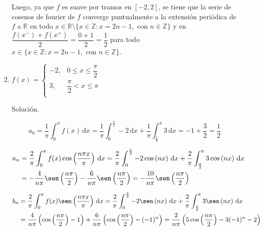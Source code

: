 \documentclass[fleqn]{article}
\newcommand{\real}{\mathbb{R}}
\newcommand{\ent}{\mathbb{Z}}
\newcommand{\intg}[3]{\int_{#1}^{#2} #3 \, \mathrm{d}x}
\begin{document}
\begin{enumerate}[I.]
\begin{enumerate}[(1)]
			Luego, ya que $f$ es suave por tramos en $ [-2,2] $, se tiene que la serie de cosenos de fourier de $f$ converge puntualmente a la extensión periódica de $f$ a $ \real $ en todo $ x \in \real \setminus \{ x \in \ent \colon x = 2n-1, \mbox{ con } n \in \ent \} $ y en $ \dfrac{f(x^-) + f(x^+)}{2} = \dfrac{0+1}{2} = \dfrac{1}{2} $ para todo $ x \in \{ x \in \ent \colon x = 2n-1, \mbox{ con } n \in \ent \} $.


			\bfseries
			\item $ f(x) = \begin{cases}
				-2, & 0 \leq x \leq \dfrac{\pi}{2} \\
				3, & \dfrac{\pi}{2} < x \leq \pi \\
			\end{cases} $

			Solución.

			\normalfont

			\begin{equation*}
				a_0 = \dfrac{1}{\pi} \intg{0}{\pi}{f(x)} = \dfrac{1}{\pi} \intg{0}{\frac{\pi}{2}}{-2} + \dfrac{1}{\pi} \intg{\frac{\pi}{2}}{\pi}{3} = -1 + \dfrac{3}{2} = \dfrac{1}{2}
			\end{equation*}

			\begin{align*}
				a_n &= \dfrac{2}{\pi} \intg{0}{\pi}{f(x) \cos \left( \dfrac{n \pi x}{\pi} \right)} = \dfrac{2}{\pi} \intg{0}{\frac{\pi}{2}}{-2 \cos \left( n x \right)} + \dfrac{2}{\pi} \intg{\frac{\pi}{2}}{\pi}{3 \cos \left( n x \right)} \\
				&= -\dfrac{4}{n \pi} \sen \left( \dfrac{n \pi}{2} \right) - \dfrac{6}{n \pi} \sen \left( \dfrac{n \pi}{2} \right) = - \dfrac{10}{n \pi} \sen \left( \dfrac{n \pi}{2} \right)
			\end{align*}

			\begin{align*}
				b_n &= \dfrac{2}{\pi} \intg{0}{\pi}{f(x) \sen \left( \dfrac{n \pi x}{\pi} \right)} = \dfrac{2}{\pi} \intg{0}{\frac{\pi}{2}}{-2 \sen \left( n x \right)} + \dfrac{2}{\pi} \intg{\frac{\pi}{2}}{\pi}{3 \sen \left( n x \right)} \\
				&= \dfrac{4}{n \pi} \left( \cos \left( \dfrac{n \pi}{2} \right) - 1 \right) + \dfrac{6}{n \pi} \left( \cos \left( \dfrac{n \pi}{2} \right) - (-1)^n \right) = \dfrac{2}{n \pi} \left( 5 \cos \left( \dfrac{n \pi}{2} \right) - 3(-1)^n - 2 \right)
			\end{align*}


\end{enumerate}
\end{enumerate}
\end{document}
